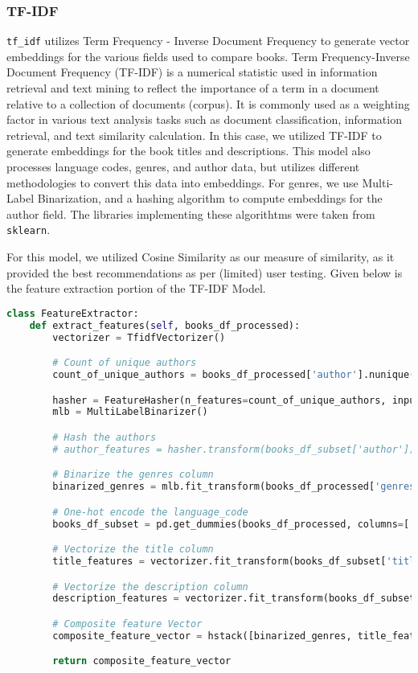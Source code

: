 \subsubsection*{TF-IDF}
\texttt{tf\_idf} utilizes Term Frequency - Inverse Document Frequency to generate vector embeddings for the various fields used to compare books. Term Frequency-Inverse Document Frequency (TF-IDF) is a numerical statistic used in information retrieval and text mining to reflect the importance of a term in a document relative to a collection of documents (corpus). It is commonly used as a weighting factor in various text analysis tasks such as document classification, information retrieval, and text similarity calculation. In this case, we utilized TF-IDF to generate embeddings for the book titles and descriptions. This model also processes language codes, genres, and author data, but utilizes different methodologies to convert this data into embeddings. For genres, we use Multi-Label Binarization, and a hashing algorithm to compute embeddings for the author field. The libraries implementing these algorithtms were taken from \texttt{sklearn}.

For this model, we utilized Cosine Similarity as our measure of similarity, as
it provided the best recommendations as per (limited) user testing. Given below
is the feature extraction portion of the TF-IDF Model.

\begin{lstlisting}[language=Python, caption={Feature Extraction using traditional ML}, label={lst:example}, linewidth=\linewidth, breaklines=true]
    class FeatureExtractor:
    def extract_features(self, books_df_processed):
        vectorizer = TfidfVectorizer()

        # Count of unique authors
        count_of_unique_authors = books_df_processed['author'].nunique()

        hasher = FeatureHasher(n_features=count_of_unique_authors, input_type='string')
        mlb = MultiLabelBinarizer()

        # Hash the authors
        # author_features = hasher.transform(books_df_subset['author'])

        # Binarize the genres column
        binarized_genres = mlb.fit_transform(books_df_processed['genres'])

        # One-hot encode the language_code
        books_df_subset = pd.get_dummies(books_df_processed, columns=['language_code'])

        # Vectorize the title column
        title_features = vectorizer.fit_transform(books_df_subset['title'])

        # Vectorize the description column
        description_features = vectorizer.fit_transform(books_df_subset['description'])

        # Composite feature Vector
        composite_feature_vector = hstack([binarized_genres, title_features, description_features])

        return composite_feature_vector
\end{lstlisting}

